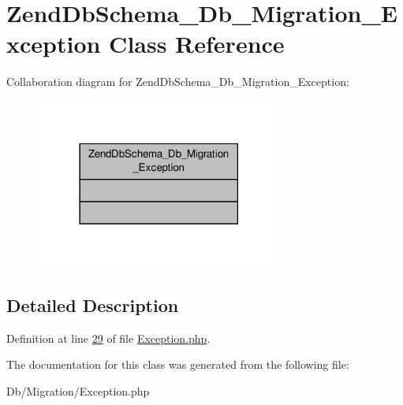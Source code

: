 \hypertarget{classZendDbSchema__Db__Migration__Exception}{\section{Zend\-Db\-Schema\-\_\-\-Db\-\_\-\-Migration\-\_\-\-Exception Class Reference}
\label{classZendDbSchema__Db__Migration__Exception}
}


Collaboration diagram for Zend\-Db\-Schema\-\_\-\-Db\-\_\-\-Migration\-\_\-\-Exception\-:\nopagebreak
\begin{figure}[H]
\begin{center}
\leavevmode
\includegraphics[width=230pt]{classZendDbSchema__Db__Migration__Exception__coll__graph}
\end{center}
\end{figure}


\subsection{Detailed Description}


Definition at line \hyperlink{Migration_2Exception_8php_source_l00029}{29} of file \hyperlink{Migration_2Exception_8php_source}{Exception.\-php}.



The documentation for this class was generated from the following file\-:\begin{DoxyCompactItemize}
\item 
Db/\-Migration/Exception.\-php\end{DoxyCompactItemize}
